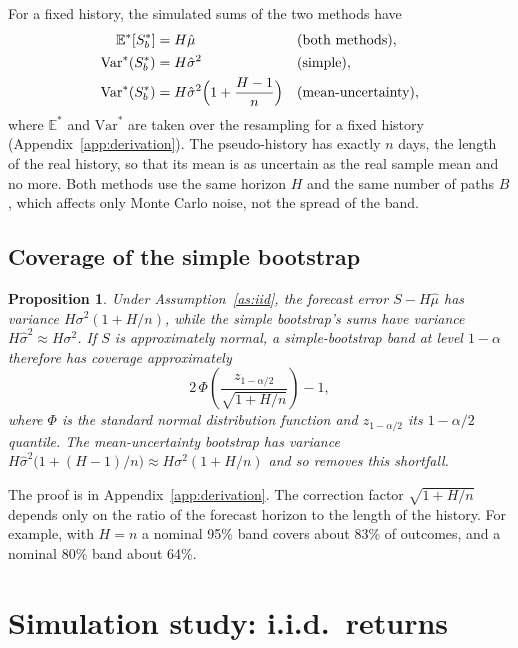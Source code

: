 \documentclass{article}
\newcommand{\E}{\mathbb{E}}
\newcommand{\muhat}{\hat\mu}
\newtheorem{proposition}{Proposition}
\begin{document}
For a fixed history, the simulated sums of the two methods have
\begin{align*}
  \E^*[S^*_b]&=H\muhat && \text{(both methods)},\\
  \mathrm{Var}^*(S^*_b)&=H\hat\sigma^2 && \text{(simple)},\\
  \mathrm{Var}^*(S^*_b)&=H\hat\sigma^2\Bigl(1+\frac{H-1}{n}\Bigr) && \text{(mean-uncertainty)},
\end{align*}
where $\E^*$ and $\mathrm{Var}^*$ are taken over the resampling for a fixed history
(Appendix~\ref{app:derivation}). The pseudo-history has exactly $n$ days, the length of the real
history, so that its mean is as uncertain as the real sample mean and no more. Both methods use the
same horizon $H$ and the same number of paths $B$, which affects only Monte Carlo noise, not the
spread of the band.

\subsection{Coverage of the simple bootstrap}
\begin{proposition}\label{prop:cov}
Under Assumption~\ref{as:iid}, the forecast error $S-H\muhat$ has variance $H\sigma^2(1+H/n)$, while
the simple bootstrap's sums have variance $H\hat\sigma^2\approx H\sigma^2$. If $S$ is approximately
normal, a simple-bootstrap band at level $1-\alpha$ therefore has coverage approximately
\[
  2\,\Phi\!\left(\frac{z_{1-\alpha/2}}{\sqrt{1+H/n}}\right)-1,
\]
where $\Phi$ is the standard normal distribution function and $z_{1-\alpha/2}$ its $1-\alpha/2$
quantile. The mean-uncertainty bootstrap has variance $H\hat\sigma^2\bigl(1+(H-1)/n\bigr)\approx
H\sigma^2(1+H/n)$ and so removes this shortfall.
\end{proposition}
The proof is in Appendix~\ref{app:derivation}. The correction factor $\sqrt{1+H/n}$ depends only on
the ratio of the forecast horizon to the length of the history. For example, with $H=n$ a nominal
95\% band covers about 83\% of outcomes, and a nominal 80\% band about 64\%.

\section{Simulation study: i.i.d.\ returns}\label{sec:sim}
\end{document}
